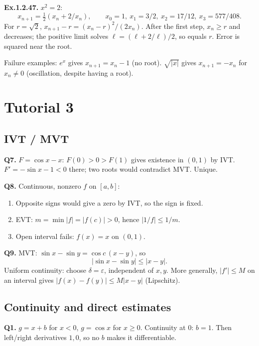 \documentclass[11pt,letterpaper]{article}
\begin{document}
\textbf{Ex.1.2.47.} \(x^2=2\): \[
x_{n+1}=\tfrac12(x_n+2/x_n),\qquad
x_0=1,\ x_1=3/2,\ x_2=17/12,\ x_3=577/408.
\] For \(r=\sqrt2\), \(x_{n+1}-r=(x_n-r)^2/(2x_n)\). After the first
step, \(x_n\ge r\) and decreases; the positive limit solves
\(\ell=(\ell+2/\ell)/2\), so equals \(r\). Error is squared near the
root.

Failure examples: \(e^x\) gives \(x_{n+1}=x_n-1\) (no root).
\(\sqrt{|x|}\) gives \(x_{n+1}=-x_n\) for \(x_n\ne0\) (oscillation,
despite having a root).

\section{Tutorial 3}\label{tutorial-3}

\subsection{IVT / MVT}\label{ivt-mvt}

\textbf{Q7.} \(F=\cos x-x\): \(F(0)>0>F(1)\) gives existence in
\((0,1)\) by IVT. \(F'=-\sin x-1<0\) there; two roots would contradict
MVT. Unique.

\textbf{Q8.} Continuous, nonzero \(f\) on \([a,b]\):

\begin{enumerate}
\def\labelenumi{(\alph{enumi})}
\item
  Opposite signs would give a zero by IVT, so the sign is fixed.
\item
  EVT: \(m=\min|f|=|f(c)|>0\), hence \(|1/f|\le1/m\).
\item
  Open interval fails: \(f(x)=x\) on \((0,1)\).
\end{enumerate}

\textbf{Q9.} MVT: \(\sin x-\sin y=\cos c\,(x-y)\), so \[
|\sin x-\sin y|\le|x-y|.
\] Uniform continuity: choose \(\delta=\varepsilon\), independent of
\(x,y\). More generally, \(|f'|\le M\) on an interval gives
\(|f(x)-f(y)|\le M|x-y|\) (Lipschitz).

\subsection{Continuity and direct
estimates}\label{continuity-and-direct-estimates}

\textbf{Q1.} \(g=x+b\) for \(x<0\), \(g=\cos x\) for \(x\ge0\).
Continuity at \(0\): \(b=1\). Then left/right derivatives \(1,0\), so no
\(b\) makes it differentiable.
\end{document}
